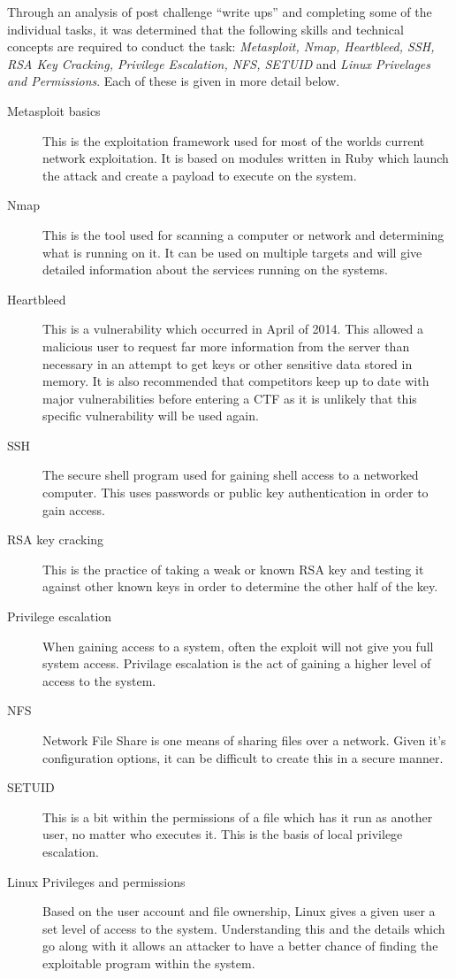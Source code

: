\documentclass[twoside,a4paper,11pt]{report}
\begin{document}
			Through an analysis of post challenge ``write ups'' and completing some of the individual tasks, 
			it was determined that the following skills and technical concepts are required to conduct the task: 
			\textit{Metasploit, Nmap, Heartbleed, SSH, RSA Key Cracking, Privilege Escalation, NFS, SETUID} and \textit{Linux Privelages and Permissions}.
			Each of these is given in more detail below. 
			\begin{description}
				\item[Metasploit basics] 
					This is the exploitation framework used for most of the worlds current network exploitation. 
					It is based on modules written in Ruby which launch the attack and create a payload to execute on the system. 
				\item[Nmap]
					This is the tool used for scanning a computer or network and determining what is running on it. 
					It can be used on multiple targets and will give detailed information about the services running on the systems. 
				\item[Heartbleed]
					This is a vulnerability which occurred in April of 2014. 
					This allowed a malicious user to request far more information from the server than necessary in an attempt to get keys or other sensitive data stored in memory. 
					It is also recommended that competitors keep up to date with major vulnerabilities before entering a CTF as it is unlikely that this specific vulnerability will be used again.
				\item[SSH]
					The secure shell program used for gaining shell access to a networked computer. 
					This uses passwords or public key authentication in order to gain access. 
				\item[RSA key cracking] 
					This is the practice of taking a weak or known RSA key and testing it against other known keys in order to determine the other half of the key. 
				\item[Privilege escalation] 
					When gaining access to a system, often the exploit will not give you full system access. 
					Privilage escalation is the act of gaining a higher level of access to the system. 
				\item[NFS]
					Network File Share is one means of sharing files over a network. 
					Given it's configuration options, it can be difficult to create this in a secure manner. 
				\item[SETUID] 
					This is a bit within the permissions of a file which has it run as another user, no matter who executes it. 
					This is the basis of local privilege escalation. 
				\item[Linux Privileges and permissions] 
					Based on the user account and file ownership, Linux gives a given user a set level of access to the system. 
					Understanding this and the details which go along with it allows an attacker to have a better chance of finding the exploitable program within the system. 
			\end{description}
\end{document}
